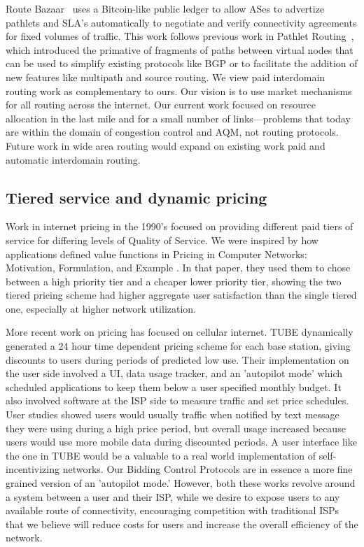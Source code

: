Route Bazaar~\cite{routebazaar15} uses a Bitcoin-like public ledger to
allow ASes to advertize pathlets and SLA's automatically to negotiate
and verify connectivity agreements for fixed volumes of traffic. This
work follows previous work in Pathlet Routing~\cite{pathlet09}, which introduced the primative of fragments of paths between virtual nodes that can be used to simplify existing protocols like BGP or to facilitate the addition of new features like multipath and source routing.
We view paid interdomain routing work as complementary to ours. Our vision is to use market mechanisms for all routing across the internet.
Our current work focused on resource allocation in the last mile and for a small number of links---problems that today are within the domain of congestion control and AQM, not routing protocols.
Future work in wide area routing would expand on existing work paid and automatic interdomain routing.

\subsection{Tiered service and dynamic pricing}
Work in internet pricing in the 1990's focused on providing different paid tiers of service for differing levels of Quality of Service.
We were inspired by how applications defined value functions in Pricing in Computer Networks: Motivation, Formulation, and Example \cite{cocchi93}. In that paper, they used them to chose between a high priority tier and a cheaper lower priority tier, showing the two tiered pricing scheme had higher aggregate user satisfaction than the single tiered one, especially at higher network utilization.

More recent work on pricing has focused on cellular internet. TUBE \cite{tube12} dynamically generated a 24 hour time dependent pricing scheme for each base station, giving discounts to users during periods of predicted low use.
Their implementation on the user side involved a UI, data usage tracker, and an 'autopilot mode' which scheduled applications to keep them below a user specified monthly budget. It also involved software at the ISP side to measure traffic and set price schedules.
User studies showed users would usually traffic when notified by text message they were using during a high price period, but overall usage increased because users would use more mobile data during discounted periods.
A user interface like the one in TUBE would be a valuable to a real world implementation of self-incentivizing networks. Our Bidding Control Protocols are in essence a more fine grained version of an 'autopilot mode.'
However, both these works revolve around a system between a user and their ISP, while we desire to expose users to any available route of connectivity, encouraging competition with traditional ISPs that we believe will reduce costs for users and increase the overall efficiency of the network.

